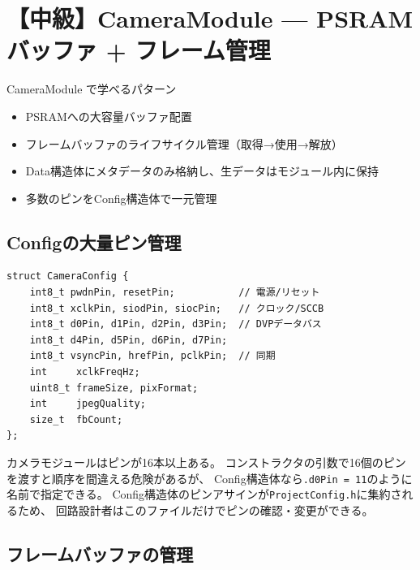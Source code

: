 \section{【中級】CameraModule — PSRAMバッファ + フレーム管理}

\begin{patternbox}{CameraModule で学べるパターン}
\begin{itemize}
    \item PSRAMへの大容量バッファ配置
    \item フレームバッファのライフサイクル管理（取得→使用→解放）
    \item Data構造体にメタデータのみ格納し、生データはモジュール内に保持
    \item 多数のピンをConfig構造体で一元管理
\end{itemize}
\end{patternbox}

\subsection{Configの大量ピン管理}

\begin{lstlisting}[style=cppstyle, caption={CameraModule.h — Config（多数のピン）}]
struct CameraConfig {
    int8_t pwdnPin, resetPin;           // 電源/リセット
    int8_t xclkPin, siodPin, siocPin;   // クロック/SCCB
    int8_t d0Pin, d1Pin, d2Pin, d3Pin;  // DVPデータバス
    int8_t d4Pin, d5Pin, d6Pin, d7Pin;
    int8_t vsyncPin, hrefPin, pclkPin;  // 同期
    int     xclkFreqHz;
    uint8_t frameSize, pixFormat;
    int     jpegQuality;
    size_t  fbCount;
};
\end{lstlisting}

\begin{pointbox}[Config構造体の威力]
カメラモジュールはピンが16本以上ある。
コンストラクタの引数で16個のピンを渡すと順序を間違える危険があるが、
Config構造体なら\texttt{.d0Pin = 11}のように名前で指定できる。
Config構造体のピンアサインが\texttt{ProjectConfig.h}に集約されるため、
回路設計者はこのファイルだけでピンの確認・変更ができる。
\end{pointbox}

\subsection{フレームバッファの管理}

